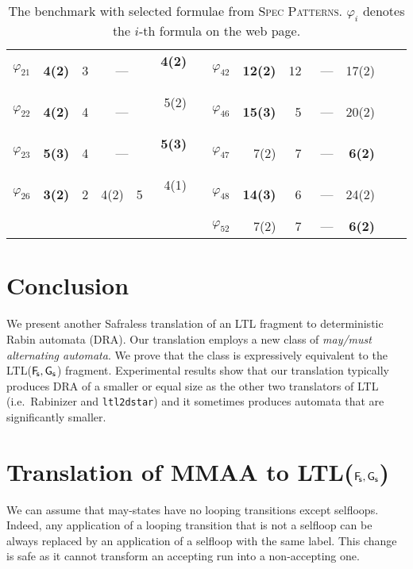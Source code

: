 \documentclass{llncs}
\begin{document}
\begin{table}[t!]
\begin{tabular}{|c||r c|rc|r|c|c||rc|rc|r|}
$\varphi_{21}$ & \textbf{4(2)}& 3 & \multicolumn{2}{|c|}{---}  & \textbf{4(2)} ~~~&&  $\varphi_{42}$ & \textbf{12(2)}& 12~ & \multicolumn{2}{|c|}{---}  & 17(2)~~~~\\  
$\varphi_{22}$ & \textbf{4(2)}& 4 & \multicolumn{2}{|c|}{---}  & 5(2) ~~~&&  $\varphi_{46}$ & \textbf{15(3)}& 5 & \multicolumn{2}{|c|}{---}  & 20(2)~~~~\\  
$\varphi_{23}$ & \textbf{5(3)}& 4 & \multicolumn{2}{|c|}{---}  & \textbf{5(3)} ~~~&&  $\varphi_{47}$ & 7(2)& 7 & \multicolumn{2}{|c|}{---} & \textbf{6(2)}~~~~\\  
$\varphi_{26}$ & \textbf{3(2)}& 2 & 4(2) & 5 & 4(1) ~~~&&  $\varphi_{48}$ & \textbf{14(3)}& 6 & \multicolumn{2}{|c|}{---}  & 24(2)~~~~\\  
\cline{1-6}
\multicolumn{7}{c|}{}&$\varphi_{52}$ & 7(2)& 7 & \multicolumn{2}{|c|}{---}  & \textbf{6(2)}~~~~\\  
\cline{8-13}
\end{tabular}
\caption{The benchmark with selected formulae from \textsc{Spec
    Patterns}. $\varphi_i$ denotes the $i$-th formula on the web page.}
\label{tab:SPEC}
\end{table}





\section{Conclusion}\label{sec:concl}
We present another Safraless translation of an LTL fragment to deterministic
Rabin automata (DRA).  Our translation employs a new class of \emph{may/must
  alternating automata}.  We prove that the class is expressively equivalent
to the LTL(${\mathsf{F}\!_\mathsf{s}},{\mathsf{G}_\mathsf{s}}$) fragment.  Experimental results show that our
translation typically produces DRA of a smaller or equal size as the other
two translators of LTL (i.e.~Rabinizer and \texttt{ltl2dstar}) and it
sometimes produces automata that are significantly smaller.








\newpage
\appendix



\section{Translation of MMAA to LTL(${\mathsf{F}\!_\mathsf{s}},{\mathsf{G}_\mathsf{s}}$)}\label{sec:mmaa2ltl}
We can assume that may-states have no looping transitions except
selfloops. Indeed, any application of a looping transition that is not a
selfloop can be always replaced by an application of a selfloop with the
same label. This change is safe as it cannot transform an accepting run into
a non-accepting one.
\end{document}
